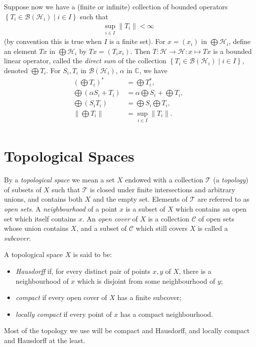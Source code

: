 \documentclass[11pt,a4paper]{report}
\theoremstyle{plain}
\theoremstyle{definition}
\newcommand{\1}{\mathbbm{1}}
\newcommand{\C}{\mathbb{C}}
\renewcommand{\H}{\mathcal{H}}
\newcommand{\B}{\mathcal{B}}
\newcommand{\T}{\mathcal{T}}
\newcommand{\cover}{\mathcal{C}}
\renewcommand{\oplus}{\textstyle\bigoplus}
\begin{document}
Suppose now we have a (finite or infinite) collection of bounded operators 
$\left\{T_i\in \B{(\H_i)} \mid i\in I\right\}$ such that
\begin{align*}
	\sup_{i\in I} {\left\|T_i\right\|} < \infty
\end{align*} 
(by convention this is true when $I$ is a finite set).
For $x=(x_i)$ in $\oplus\H_i$, define an element $Tx$ in $\oplus\H_i$ by 
$Tx=(T_ix_i)$. Then $T:\H\to\H:x\mapsto Tx$ is a bounded linear operator, called 
the \emph{direct sum} of the collection $\left\{T_i\in\B{(\H_i)} \mid i \in 
I\right\}$, denoted $\oplus T_i$. For $S_i,T_i$ in $\B(\H_i)$, $\alpha$ in 
$\C$, we have 
\begin{align*}
		\left(\oplus T_i\right)^\ast &= \oplus T_i^\ast,										\\
		\oplus (\alpha S_i+ T_i) &= 
					\alpha \oplus S_i + \oplus T_i, 											\\
		\oplus (S_i T_i) &= \oplus S_i \oplus T_i,												\\
		\left\|\oplus T_i\right\| &= \sup_{i\in I} {\left\|T_i\right\|}.						\\
\end{align*}

\section{Topological Spaces}
By a \emph{topological space} we mean a set $X$ endowed with a collection $\T$ 
(a \emph{topology}) of subsets of $X$ such that $\T$ is closed under finite 
intersections and arbitrary unions, and contains both $X$ and the empty set. 
Elements of $\T$ are referred to as \emph{open sets}.
A \emph{neighbourhood} of a point $x$ is a subset of $X$ which contains an open 
set which itself contains $x$. An \emph{open cover} of $X$ is a collection 
$\cover$ of open sets whose union contains $X$, and a subset of $\cover$ which 
still covers $X$ is called a \emph{subcover}. 

A topological space $X$ is said to be:
\begin{itemize}
	\item \emph{Hausdorff} if, for every distinct pair of points $x,y$ of $X$, 
	there is a neighbourhood of $x$ which is disjoint from some neighbourhood of $y$;
	\item \emph{compact} if every open cover of $X$ has a finite subcover;
	\item \emph{locally compact} if every point of $x$ has a compact neighbourhood.
\end{itemize}
Most of the topology we use will be compact and Hausdorff, and locally compact 
and Hausdorff at the least.
\end{document}
